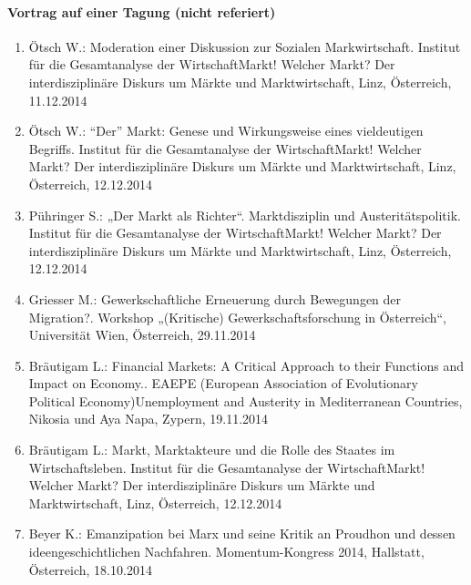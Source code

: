     \paragraph{Vortrag auf einer Tagung (nicht referiert)}
\begin{enumerate}
	\item Ötsch W.: Moderation einer Diskussion zur Sozialen Markwirtschaft. Institut für die Gesamtanalyse der WirtschaftMarkt! Welcher Markt? Der interdisziplinäre Diskurs um Märkte und Marktwirtschaft, Linz, Österreich, 11.12.2014
	\item Ötsch W.: “Der” Markt: Genese und Wirkungsweise eines vieldeutigen Begriffs. Institut für die Gesamtanalyse der WirtschaftMarkt! Welcher Markt? Der interdisziplinäre Diskurs um Märkte und Marktwirtschaft, Linz, Österreich, 12.12.2014
	\item Pühringer S.: „Der Markt als Richter“. Marktdisziplin und Austeritätspolitik. Institut für die Gesamtanalyse der WirtschaftMarkt! Welcher Markt? Der interdisziplinäre Diskurs um Märkte und Marktwirtschaft, Linz, Österreich, 12.12.2014
	\item Griesser M.: Gewerkschaftliche Erneuerung durch Bewegungen der Migration?. Workshop „(Kritische) Gewerkschaftsforschung in Österreich“, Universität Wien, Österreich, 29.11.2014
	\item Bräutigam L.: Financial Markets: A Critical Approach to their Functions and Impact on Economy.. EAEPE (European Association of Evolutionary Political Economy)Unemployment and Austerity in Mediterranean Countries, Nikosia und Aya Napa, Zypern, 19.11.2014
	\item Bräutigam L.: Markt, Marktakteure und die Rolle des Staates im Wirtschaftsleben. Institut für die Gesamtanalyse der WirtschaftMarkt! Welcher Markt? Der interdisziplinäre Diskurs um Märkte und Marktwirtschaft, Linz, Österreich, 12.12.2014
	\item Beyer K.: Emanzipation bei Marx und seine Kritik an Proudhon und dessen ideengeschichtlichen Nachfahren. Momentum-Kongress 2014, Hallstatt, Österreich, 18.10.2014
\end{enumerate}
